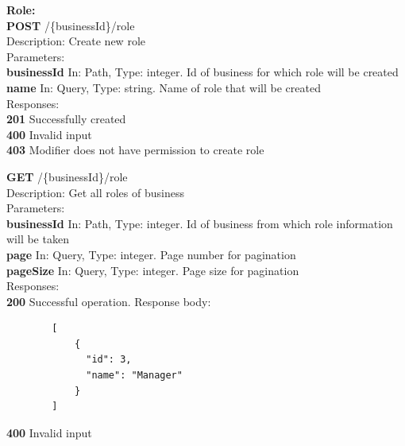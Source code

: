 \documentclass[11pt,a4paper,pdftex]{article}
\begin{document}
\textbf{Role:}\\
\hspace*{1em}\textbf{POST} /\{businessId\}/role\\
\hspace*{2em}Description: Create new role\\
\hspace*{2em}Parameters:\\
\hspace*{3em}\textbf{businessId} In: Path, Type: integer. Id of business for which role will be created\\
\hspace*{3em}\textbf{name} In: Query, Type: string. Name of role that will be created\\
\hspace*{2em}Responses:\\
\hspace*{3em}\textbf{201} Successfully created\\
\hspace*{3em}\textbf{400} Invalid input\\
\hspace*{3em}\textbf{403} Modifier does not have permission to create role

\hspace*{1em}\textbf{GET} /\{businessId\}/role\\
\hspace*{2em}Description: Get all roles of business\\
\hspace*{2em}Parameters:\\
\hspace*{3em}\textbf{businessId} In: Path, Type: integer. Id of business from which role information will be taken\\
\hspace*{3em}\textbf{page} In: Query, Type: integer. Page number for pagination\\
\hspace*{3em}\textbf{pageSize} In: Query, Type: integer. Page size for pagination\\
\hspace*{2em}Responses:\\
\hspace*{3em}\textbf{200} Successful operation. Response body:
\begin{verbatim}
        [
            {
              "id": 3,
              "name": "Manager"
            }
        ]
\end{verbatim}
\hspace*{3em}\textbf{400} Invalid input\\
\end{document}
